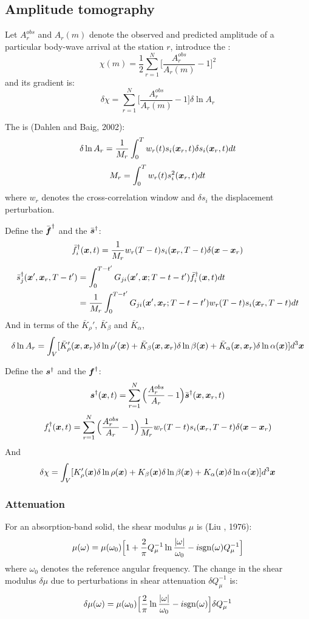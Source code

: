 \subsection{Amplitude tomography}
Let $A_r^{obs}$ and $A_r(m)$ denote the observed and predicted amplitude
of a particular body-wave arrival at the station $r$,
introduce the :
\[ \chi(m)=\frac{1}{2}\sum_{r=1}^N\Big[\frac{A_r^{obs}}{A_r(m)}-1\Big]^2 \]
and its gradient is:
\[ \delta\chi=\sum_{r=1}^N\Big[\frac{A_r^{obs}}{A_r(m)}-1\Big]\delta\ln A_r \]

The  is (Dahlen and Baig, 2002):
\[ \delta\ln A_r=\frac{1}{M_r}\int_0^Tw_r(t)s_i(\boldsymbol{x}_r,t)\delta s_i(\boldsymbol{x}_r,t)dt \]
\[ M_r=\int_0^Tw_r(t)s_i^2(\boldsymbol{x}_r,t)dt \]
where $w_r$ denotes the cross-correlation window and $\delta s_i$ the displacement perturbation.

Define the  $\bar{\boldsymbol{f}}^\dagger$
and the  $\bar{\boldsymbol{s}}^\dagger$:
\[ \bar f_i^\dagger(\boldsymbol{x},t)=\frac{1}{M_r}w_r(T-t)s_i(\boldsymbol{x}_r,T-t)\delta(\boldsymbol{x}-\boldsymbol{x}_r) \]
\begin{align*}
  \bar s_j^\dagger(\boldsymbol{x}',\boldsymbol{x}_r,T-t') & =\int_0^{T-t'}G_{ji}(\boldsymbol{x}',\boldsymbol{x};T-t-t')\bar f_i^\dagger(\boldsymbol{x},t) dt \\
    & =\frac{1}{M_r}\int_0^{T-t'}G_{ji}(\boldsymbol{x}',\boldsymbol{x}_r;T-t-t')w_r(T-t)s_i(\boldsymbol{x}_r,T-t)dt
\end{align*}
And in terms of the 
$\bar K_\rho'$, $\bar K_\beta$ and $\bar K_\alpha$,
\[ \delta\ln A_r=\int_V[\bar K_\rho'(\boldsymbol{x},\boldsymbol{x}_r)\delta\ln\rho'(\boldsymbol{x})+\bar K_\beta(\boldsymbol{x},\boldsymbol{x}_r)\delta\ln\beta(\boldsymbol{x})+\bar K_\alpha(\boldsymbol{x},\boldsymbol{x}_r)\delta\ln\alpha(\boldsymbol{x})]d^3\boldsymbol{x} \]

Define the  $\boldsymbol{s}^\dagger$
and the  $\boldsymbol{f}^\dagger$:
\[ \boldsymbol{s}^\dagger(\boldsymbol{x},t)=\sum_{r=1}^N\Big(\frac{A_r^{obs}}{A_r}-1\Big)\bar{\boldsymbol{s}}^\dagger(\boldsymbol{x},\boldsymbol{x}_r,t) \]
\[ f_i^\dagger(\boldsymbol{x},t)=\sum_{r=1}^N\Big(\frac{A_r^{obs}}{A_r}-1\Big)\frac{1}{M_r}w_r(T-t)s_i(\boldsymbol{x}_r,T-t)\delta(\boldsymbol{x}-\boldsymbol{x}_r) \]
And
\[ \delta\chi=\int_V[K_\rho'(\boldsymbol{x})\delta\ln\rho(\boldsymbol{x})+K_\beta(\boldsymbol{x})\delta\ln\beta(\boldsymbol{x})+K_\alpha(\boldsymbol{x})\delta\ln\alpha(\boldsymbol{x})]d^3\boldsymbol{x} \]

\subsubsection{Attenuation}
For an absorption-band solid, the shear modulus $\mu$ is (Liu \etal, 1976):
\[ \mu(\omega)=\mu(\omega_0)\Big[1+\frac{2}{\pi}Q_\mu^{-1}\ln\frac{|\omega|}{\omega_0}-i\text{sgn}(\omega)Q_\mu^{-1}\Big] \]
where $\omega_0$ denotes the reference angular frequency.
The change in the shear modulus $\delta\mu$
due to perturbations in shear attenuation $\delta Q_\mu^{-1}$ is:
\[ \delta\mu(\omega)=\mu(\omega_0)\Big[\frac{2}{\pi}\ln\frac{|\omega|}{\omega_0}-i\text{sgn}(\omega)\Big]\delta Q_\mu^{-1} \]

